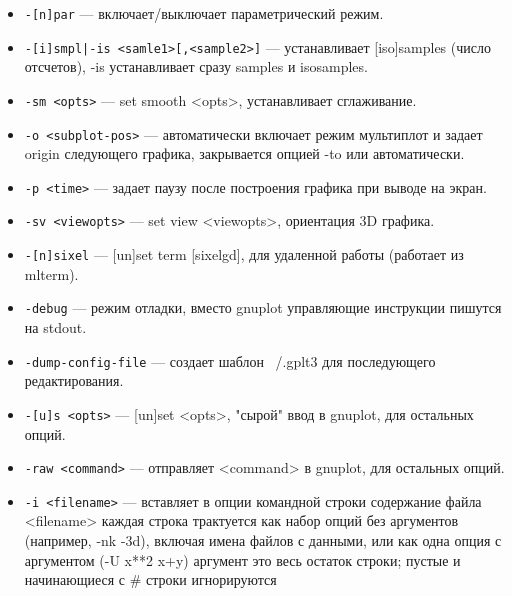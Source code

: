 \documentclass[12pt]{article}
\begin{document}
\begin{itemize}
\item \verb'-[n]par' --- включает/выключает параметрический режим.
\item \verb'-[i]smpl|-is <samle1>[,<sample2>]' --- устанавливает [iso]samples (число отсчетов), 
                                     -is устанавливает сразу samples и isosamples.
\item \verb'-sm <opts>' --- set smooth <opts>, устанавливает сглаживание.
\item \verb'-o <subplot-pos>' --- автоматически включает режим мультиплот и задает origin 
   следующего графика, закрывается опцией -to или автоматически.
\item \verb'-p <time>' --- задает паузу после построения графика при выводе на экран.
\item \verb'-sv <viewopts>' --- set view <viewopts>, ориентация 3D графика.
\item \verb'-[n]sixel' --- [un]set term [sixelgd], для удаленной работы (работает из mlterm).
\item \verb'-debug' --- режим отладки, вместо gnuplot управляющие инструкции пишутся на stdout.
\item \verb'-dump-config-file' --- создает шаблон ~/.gplt3 для последующего редактирования.
\item \verb'-[u]s <opts>' --- [un]set <opts>, "сырой" ввод в gnuplot, для остальных опций.
\item \verb'-raw <command>' --- отправляет <command> в gnuplot, для остальных опций.
\item \verb'-i <filename>' --- вставляет в опции командной строки содержание файла <filename>
   каждая строка трактуется как набор опций без аргументов (например, -nk -3d), 
   включая имена файлов с данными, или как одна опция с аргументом (-U x**2 x+y)
   аргумент это весь остаток строки; пустые и начинающиеся с \# строки игнорируются
\end{itemize}
\end{document}

